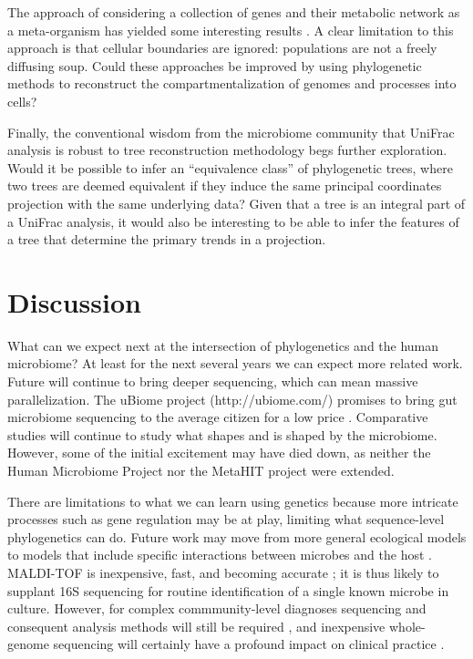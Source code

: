 \documentclass{amsart}
\begin{document}
The approach of considering a collection of genes and their metabolic network as a meta-organism has yielded some interesting results \citep{borenstein2008large,greenblum2012metagenomic}.
A clear limitation to this approach is that cellular boundaries are ignored: populations are not a freely diffusing soup.
Could these approaches be improved by using phylogenetic methods to reconstruct the compartmentalization of genomes and processes into cells?

Finally, the conventional wisdom from the microbiome community that UniFrac analysis is robust to tree reconstruction methodology begs further exploration.
Would it be possible to infer an ``equivalence class'' of phylogenetic trees, where two trees are deemed equivalent if they induce the same principal coordinates projection with the same underlying data?
Given that a tree is an integral part of a UniFrac analysis, it would also be interesting to be able to infer the features of a tree that determine the primary trends in a projection.


\section{Discussion}
What can we expect next at the intersection of phylogenetics and the human microbiome?
At least for the next several years we can expect more related work.
Future will continue to bring deeper sequencing, which can mean massive parallelization.
The uBiome project (http://ubiome.com/) promises to bring gut microbiome sequencing to the average citizen for a low price \citep{costandi2013citizen}.
Comparative studies will continue to study what shapes and is shaped by the microbiome.
However, some of the initial excitement may have died down, as neither the Human Microbiome Project nor the MetaHIT project were extended.

There are limitations to what we can learn using genetics because more intricate processes such as gene regulation may be at play, limiting what sequence-level phylogenetics can do.
Future work may move from more general ecological models to models that include specific interactions between microbes and the host \citep[e.g.][]{hooper2012interactions}.
MALDI-TOF is inexpensive, fast, and becoming accurate \citep{clark2013matrix}; it is thus likely to supplant 16S sequencing for routine identification of a single known microbe in culture.
However, for complex commmunity-level diagnoses sequencing and consequent analysis methods will still be required \citep[see review][]{Rogers2013271}, and inexpensive whole-genome sequencing will certainly have a profound impact on clinical practice \citep{didelot2012transforming}.
\end{document}

